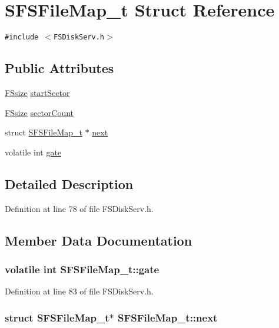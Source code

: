 \hypertarget{struct_s_f_s_file_map__t}{
\section{SFSFileMap\_\-t Struct Reference}
\label{struct_s_f_s_file_map__t}
}
{\tt \#include $<$FSDiskServ.h$>$}

\subsection*{Public Attributes}
\begin{CompactItemize}
\item 
\hyperlink{filesystem__afx_8h_2dfedf2033eee861d23c808f79ed5837}{FSsize} \hyperlink{struct_s_f_s_file_map__t_1d880b3182af88ac4669dcef9fbf359a}{startSector}
\item 
\hyperlink{filesystem__afx_8h_2dfedf2033eee861d23c808f79ed5837}{FSsize} \hyperlink{struct_s_f_s_file_map__t_a116506047ffd9b13cc76bc355744af4}{sectorCount}
\item 
struct \hyperlink{struct_s_f_s_file_map__t}{SFSFileMap\_\-t} $\ast$ \hyperlink{struct_s_f_s_file_map__t_e17e82daa267cd2bdda57df98e5b52f7}{next}
\item 
volatile int \hyperlink{struct_s_f_s_file_map__t_b308235d7672843cb7d2461a02831c4c}{gate}
\end{CompactItemize}


\subsection{Detailed Description}


Definition at line 78 of file FSDiskServ.h.

\subsection{Member Data Documentation}
\hypertarget{struct_s_f_s_file_map__t_b308235d7672843cb7d2461a02831c4c}{
\subsubsection[{gate}]{\setlength{\rightskip}{0pt plus 5cm}volatile int {\bf SFSFileMap\_\-t::gate}}}
\label{struct_s_f_s_file_map__t_b308235d7672843cb7d2461a02831c4c}




Definition at line 83 of file FSDiskServ.h.\hypertarget{struct_s_f_s_file_map__t_e17e82daa267cd2bdda57df98e5b52f7}{
\subsubsection[{next}]{\setlength{\rightskip}{0pt plus 5cm}struct {\bf SFSFileMap\_\-t}$\ast$ {\bf SFSFileMap\_\-t::next}}}
\label{struct_s_f_s_file_map__t_e17e82daa267cd2bdda57df98e5b52f7}




